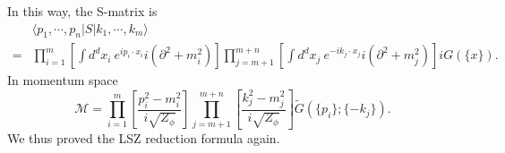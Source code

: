 In this way, the S-matrix is
\begin{equation}
\begin{aligned}
	& \langle p_1, \cdots, p_n| S |k_1, \cdots, k_m\rangle  \\
	=& \prod_{i=1}^{m}\left[ \int d^dx_i \ e^{ip_i\cdot x_i}i(\partial^2+m_i^2)\right]
	\prod_{j=m+1}^{m+n}\left[\int d^dx_j \ e^{-ik_j\cdot x_j}i(\partial^2+m_j^2)\right] iG(\{x\}).
	\label{eq:K-G-LSZ}
\end{aligned}
\end{equation}
In momentum space
\begin{equation}
	\mathcal M = \prod_{i=1}^{m}\left[\frac{p_i^2-m_i^2}{i\sqrt{Z_\phi}}\right]
		\prod_{j=m+1}^{m+n}\left[\frac{k_j^2-m_j^2}{i\sqrt{Z_\phi}}\right]
		\tilde{G}(\{p_i\};\{-k_j\}).
\end{equation}
We thus proved the LSZ reduction formula again.


